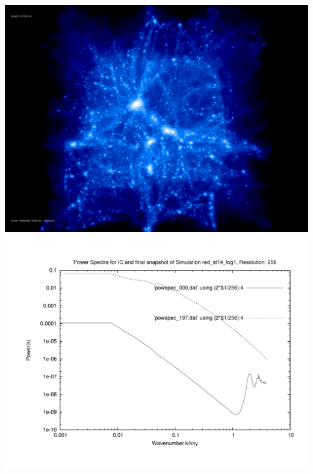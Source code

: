 \includegraphics[scale=0.1]{r256/h70/red_st14_log1/197.jpg} \\ 

\includegraphics[scale=0.5]{r256/h70/red_st14_log1/plot_powspec_red_st14_log1.pdf}

